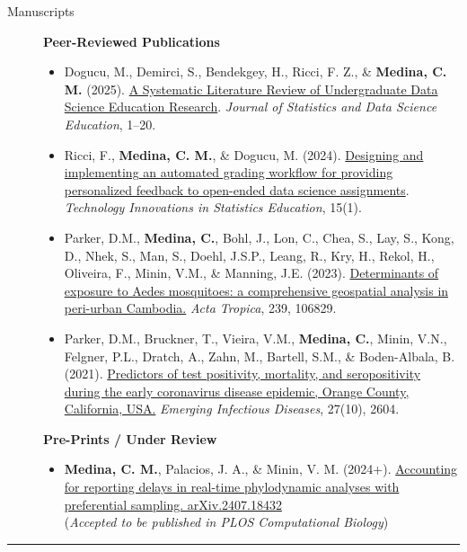 \documentclass{article}
\begin{document}
	\begin{description}
		\vspace{-2mm}
		
		\item[Manuscripts] \hspace*{.1in} 
		
		\textbf{Peer-Reviewed Publications}
		\begin{itemize}
			\item Dogucu, M., Demirci, S., Bendekgey, H., Ricci, F. Z., \& \textbf{Medina, C. M.} (2025). \href{https://doi.org/10.1080/26939169.2025.2486656}{A Systematic Literature Review of Undergraduate Data Science Education Research}. \textit{Journal of Statistics and Data Science Education}, 1–20.
			
			\item Ricci, F., \textbf{Medina, C. M.}, \& Dogucu, M. (2024). \href{https://doi.org/10.5070/T5.1886}{Designing and implementing an automated grading workflow for providing personalized feedback to open-ended data science assignments}. \textit{Technology Innovations in Statistics Education}, 15(1).
			
			\item Parker, D.M., \textbf{Medina, C.}, Bohl, J., Lon, C., Chea, S., Lay, S., Kong, D., Nhek, S., Man, S., Doehl, J.S.P., Leang, R., Kry, H., Rekol, H., Oliveira, F., Minin, V.M., \& Manning, J.E. (2023). \href{https://doi.org/10.1016/j.actatropica.2023.106829}{Determinants of exposure to Aedes mosquitoes: a comprehensive geospatial analysis in peri-urban Cambodia.} \textit{Acta Tropica}, 239, 106829. 
			
			\item Parker, D.M., Bruckner, T., Vieira, V.M., \textbf{Medina, C.}, Minin, V.N., Felgner, P.L., Dratch, A., Zahn, M., Bartell, S.M., \& Boden-Albala, B. (2021). \href{https://doi.org/10.3201/eid2710.210103}{Predictors of test positivity, mortality, and seropositivity during the early coronavirus disease epidemic, Orange County, California, USA.} \textit{Emerging Infectious Diseases}, 27(10), 2604.
		\end{itemize}	
		
		\textbf{Pre-Prints / Under Review}
		\begin{itemize}
			\item \textbf{Medina, C. M.}, Palacios, J. A., \& Minin, V. M. (2024+). \href{https://doi.org/10.48550/arXiv.2407.18432}{Accounting for reporting delays in real-time phylodynamic analyses with preferential sampling. arXiv.2407.18432}\\ (\textit{Accepted to be published in PLOS Computational Biology})
			
		\end{itemize}
		
	\end{description}
	\vspace{-2mm}
	\rule{\linewidth}{1pt}
	
\end{document}
